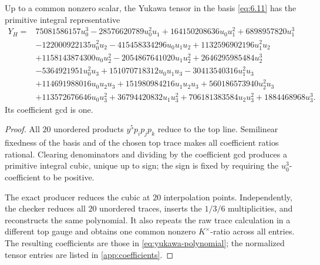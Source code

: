 \begin{theorem}
\label{thm:yukawa}
Up to a common nonzero scalar, the Yukawa tensor in the basis
\cref{eq:6.11} has the primitive integral representative
\[
\tag{6.12}
\label{eq:yukawa-polynomial}
\begin{aligned}
Y_H={}&75081586157u_0^3-28576620789u_0^2u_1
+164150208636u_0u_1^2+6898957820u_1^3\\
&-122000922135u_0^2u_2-415458334296u_0u_1u_2
+1132596902196u_1^2u_2\\
&+1158143874300u_0u_2^2-2054867641020u_1u_2^2
+2646295985484u_2^3\\
&-5364921951u_0^2u_3+151070718312u_0u_1u_3
-30413540316u_1^2u_3\\
&+114691988016u_0u_2u_3+151980984216u_1u_2u_3
+560186573940u_2^2u_3\\
&+113572676646u_0u_3^2+36794420832u_1u_3^2
+706181383584u_2u_3^2+1884468968u_3^3.
\end{aligned}
\]
Its coefficient gcd is one.
\end{theorem}

\begin{proof}
All \(20\) unordered products \(y^5p_ip_jp_k\) reduce to the top line.
Semilinear fixedness of the basis and of the chosen top trace makes all
coefficient ratios rational.  Clearing denominators and dividing by the
coefficient gcd produces a primitive integral cubic, unique up to sign; the
sign is fixed by requiring the \(u_0^3\)-coefficient to be positive.

The exact producer reduces the cubic at \(20\) interpolation points.
Independently, the checker reduces all \(20\) unordered traces, inserts the
\(1/3/6\) multiplicities, and reconstructs the same polynomial.  It also
repeats the raw trace calculation in a different top gauge and obtains one
common nonzero \(K^\times\)-ratio across all entries.  The resulting
coefficients are those in \cref{eq:yukawa-polynomial}; the normalized tensor
entries are listed in \cref{app:coefficients}.
\end{proof}
